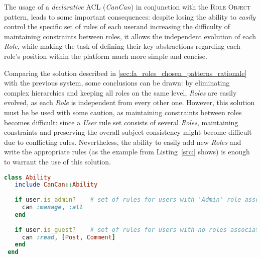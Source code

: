 The usage of a \emph{declarative} ACL (\emph{CanCan}) in conjunction with the \textsc{Role Object} pattern, leads to some important consequences: despite losing the ability to \emph{easily} control the specific set of rules of each user\footnotemark and increasing the difficulty of maintaining constraints between roles, it allows the independent evolution of each \emph{Role}, while making the task of defining their key abstractions regarding each role's position within the platform much more simple and concise.

Comparing the solution described in \ref{sec:fa_roles_chosen_patterns_rationale} with the previous system, some conclusions can be drawn: by eliminating complex hierarchies and keeping all roles on the same level, \emph{Roles} are easily evolved, as each \emph{Role} is independent from every other one. However, this solution must be be used with some caution, as maintaining constraints between roles becomes difficult: since a \emph{User} rule set consists of several \emph{Roles}, maintaining constraints and preserving the overall subject consistency might become difficult due to conflicting rules. Nevertheless, the ability to easily add new \emph{Roles} and write the appropriate rules (as the example from Listing~\ref{src:} shows) is enough to warrant the use of this solution.

\begin{lstlisting}[language=ruby, float=htb, label=src:cancan_examples, caption=CanCan rule definition example.]
 class Ability
   include CanCan::Ability
 
   if user.is_admin?    # set of rules for users with 'Admin' role associated
     can :manage, :all
   end
   
   if user.is_guest?    # set of rules for users with no roles associated
     can :read, [Post, Comment]
   end
 end
\end{lstlisting}







